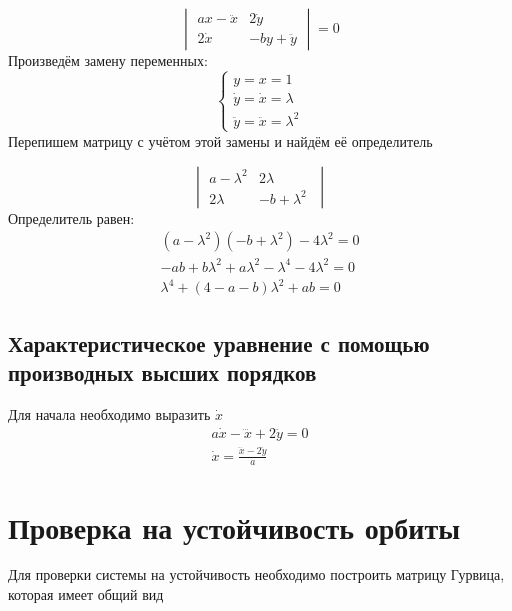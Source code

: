 \documentclass[12pt, a4paper]{article}
\begin{document}
\begin{displaymath}
    \begin{vmatrix}
        ax - \ddot x & 2 \dot y\\
        2 \dot x & - by + \ddot y
    \end{vmatrix}
    = 0 
\end{displaymath}
Произведём замену переменных: 
\begin{equation*}
    \begin{cases}
        y = x = 1 \\
        \dot y = \dot x = \lambda \\
        \ddot y = \ddot x = \lambda^2
    \end{cases}
\end{equation*}
Перепишем матрицу с учётом этой замены и найдём её определитель

\begin{equation*}
    \begin{vmatrix}
        a - \lambda^2 & 2 \lambda\;\\
        2 \lambda & - b + \lambda^2\;
    \end{vmatrix}
\end{equation*}
Определитель равен:
\begin{align*}
   (a - \lambda^2)(- b + \lambda^2) - 4 \lambda^2 = 0\\
    - ab + b \lambda^2 + a \lambda^2 - \lambda^4 - 4 \lambda^2 = 0\\
    \boxed{
    \lambda^4 + (4 - a - b) \lambda^2 + ab = 0
    }
\end{align*}

\subsection{Характеристическое уравнение с помощью производных высших порядков}

Для начала необходимо выразить $\dot x$
\begin{gather*}
    a \dot x - \dddot x + 2 \ddot y = 0\\
    \dot x = \frac{\dddot x - 2 \ddot y}{a}
\end{gather*}

\section{Проверка на устойчивость орбиты}

Для проверки системы на устойчивость необходимо построить матрицу Гурвица, которая имеет общий вид
\end{document}
